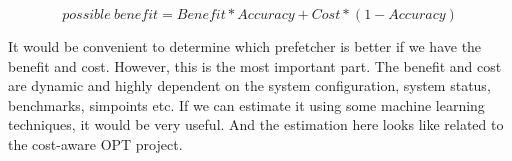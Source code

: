 \begin{equation}
possible\ benefit = Benefit * Accuracy + Cost * (1-Accuracy)
\end{equation}

It would be convenient to determine which prefetcher is better if we have the benefit and cost. However, this is the most important part. The benefit and cost are dynamic and highly dependent on the system configuration, system status, benchmarks, simpoints etc. If we can estimate it using some machine learning techniques, it would be very useful. And the estimation here looks like related to the cost-aware OPT project.

